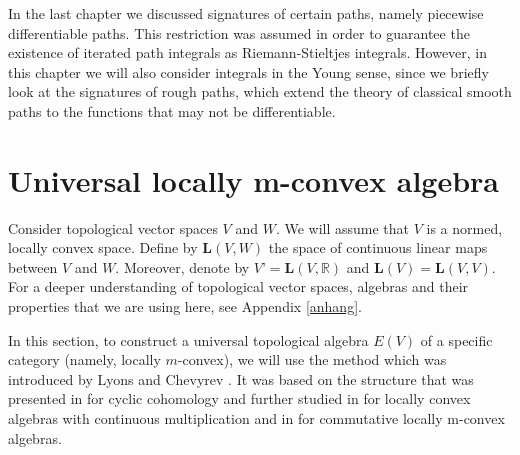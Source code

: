 \documentclass[12pt,a4paper]{report}
\theoremstyle{definition}
\begin{document}
In the last chapter we discussed signatures of certain paths, namely piecewise differentiable paths. This restriction was assumed in order to guarantee the existence of iterated path integrals as Riemann-Stieltjes integrals. However, in this chapter we will also consider integrals in the Young sense, since we briefly look at the signatures of rough paths, which extend the theory of classical smooth paths to the functions that  may not be differentiable.










\section{Universal locally m-convex algebra}

Consider topological vector spaces $V$ and $W$. We will assume that $V$ is a normed, locally convex space. Define by $\textbf{L}(V,W)$ the space of continuous linear maps between $V$ and $W$. Moreover, denote by $V’=\textbf{L}(V,\mathbb{R})$ and $\textbf{L}(V)=\textbf{L}(V,V)$. For a deeper understanding of topological vector spaces, algebras and their properties that we are using here, see Appendix \ref{anhang}.

In this section, to construct a universal topological algebra $E(V)$ of a specific category (namely, locally $m$-convex), we will use the method which was introduced by Lyons and Chevyrev \parencite{chevyrev2016characteristic}. It was based on the structure that was presented in \parencite{cuntz1997excision} for cyclic cohomology and further studied in \parencite{valqui2001universal} for locally convex algebras with continuous multiplication and in \parencite{dineen2011complex} for commutative locally m-convex algebras.
\end{document}
